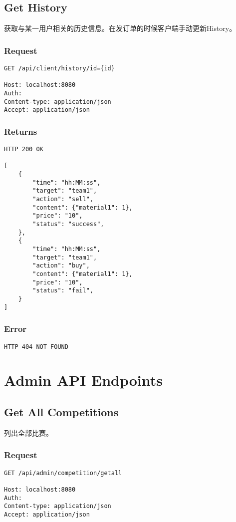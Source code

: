 \documentclass{article}
\begin{document}
\subsection{Get History}
获取与某一用户相关的历史信息。在发订单的时候客户端手动更新History。
\subsubsection*{Request}
\begin{lstlisting}
GET /api/client/history/id={id}

Host: localhost:8080
Auth:
Content-type: application/json
Accept: application/json
\end{lstlisting}
\subsubsection*{Returns}
\begin{lstlisting}
HTTP 200 OK

[
	{
	    "time": "hh:MM:ss",
	    "target": "team1",
        "action": "sell",
	    "content": {"material1": 1},
        "price": "10",
	    "status": "success",
	},
	{
	    "time": "hh:MM:ss",
	    "target": "team1",
        "action": "buy",
	    "content": {"material1": 1},
        "price": "10",
	    "status": "fail",
	}
]
\end{lstlisting}
\subsubsection*{Error}
\begin{lstlisting}
HTTP 404 NOT FOUND
\end{lstlisting}






\section{Admin API Endpoints}
\subsection{Get All Competitions}

列出全部比赛。

\subsubsection*{Request}
\begin{lstlisting}
GET /api/admin/competition/getall

Host: localhost:8080
Auth:
Content-type: application/json
Accept: application/json
\end{lstlisting}
\end{document}
